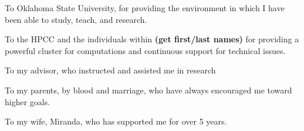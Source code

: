 \begin{acknowledge}

To Oklahoma State University, for providing the environment in which I have been able to study, teach, and research.

To the HPCC and the individuals within \textbf{(get first/last names)} for providing a powerful cluster for computations and continuous support for technical issues.

To my advisor, who instructed and assisted me in research

To my parents, by blood and marriage, who have always encouraged me toward higher goals.

To my wife, Miranda, who has supported me for over 5 years. 


\end{acknowledge}
